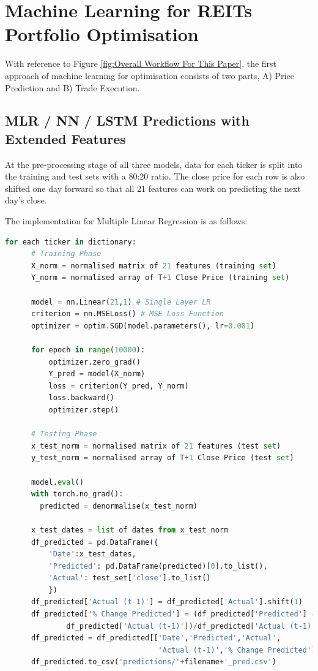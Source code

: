 \documentclass[a4paper,12pt]{report}
\numberwithin{equation}{section}
\theoremstyle{definition}
\begin{document}

\section{Machine Learning for REITs Portfolio Optimisation}
With reference to Figure \ref{fig:Overall Workflow For This Paper}, the first approach of machine learning for optimisation consists of two parts, A) Price Prediction and B) Trade Execution.


\subsection{MLR / NN / LSTM Predictions with Extended Features}
At the pre-processing stage of all three models, data for each ticker is split into the training and test sets with a 80:20 ratio. The close price for each row is also shifted one day forward so that all 21 features can work on predicting the next day's close.  

The implementation for Multiple Linear Regression is as follows:
\begin{lstlisting}[language=Python, caption=Multiple Linear Regression Pseudocode, basicstyle=\footnotesize\ttfamily]
  for each ticker in dictionary:
      # Training Phase
      X_norm = normalised matrix of 21 features (training set)
      Y_norm = normalised array of T+1 Close Price (training set)
  
      model = nn.Linear(21,1) # Single Layer LR
      criterion = nn.MSELoss() # MSE Loss Function
      optimizer = optim.SGD(model.parameters(), lr=0.001)

      for epoch in range(10000):
          optimizer.zero_grad()
          Y_pred = model(X_norm)
          loss = criterion(Y_pred, Y_norm)
          loss.backward()
          optimizer.step()
    
      # Testing Phase
      x_test_norm = normalised matrix of 21 features (test set)
      y_test_norm = normalised array of T+1 Close Price (test set)

      model.eval()
      with torch.no_grad():
        predicted = denormalise(x_test_norm)

      x_test_dates = list of dates from x_test_norm
      df_predicted = pd.DataFrame({
          'Date':x_test_dates,
          'Predicted': pd.DataFrame(predicted)[0].to_list(),
          'Actual': test_set['close'].to_list()
          })
      df_predicted['Actual (t-1)'] = df_predicted['Actual'].shift(1)    
      df_predicted['% Change Predicted'] = (df_predicted['Predicted'] - 
              df_predicted['Actual (t-1)'])/df_predicted['Actual (t-1)']
      df_predicted = df_predicted[['Date','Predicted','Actual',
                                   'Actual (t-1)','% Change Predicted']]
      df_predicted.to_csv('predictions/'+filename+'_pred.csv')
  \end{lstlisting}
\end{document}
